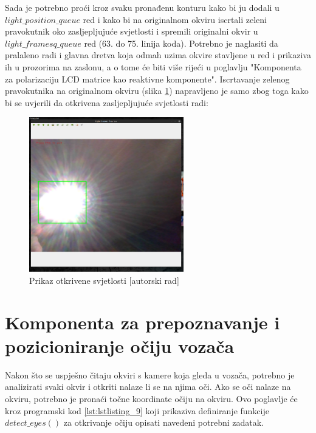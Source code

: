 \documentclass{foi}
\begin{document}
Sada je potrebno proći kroz svaku pronađenu konturu kako bi ju dodali u $light\_position\_queue$ red i kako bi na originalnom okviru iscrtali zeleni pravokutnik oko zasljepljujuće svjetlosti i spremili originalni okvir u $light\_framesq\_queue$ red (63. do 75. linija koda). Potrebno je naglasiti da pralaleno radi i glavna dretva koja odmah uzima okvire stavljene u red i prikaziva ih u prozorima na zaslonu, a o tome će biti više rijeći u poglavlju "Komponenta za polarizaciju LCD matrice kao reaktivne komponente". Iscrtavanje zelenog pravokutnika na originalnom okviru (slika \ref{fig:sustav2}) napravljeno je samo zbog toga kako bi se uvjerili da otkrivena zasljepljujuće svjetlosti radi:

\begin{figure}[h!]
    \centering
    \includegraphics[width=0.6\textwidth]{slike/sustav2}
    \caption{Prikaz otkrivene svjetlosti [autorski rad]}
    \label{fig:sustav2}
\end{figure}

\pagebreak
\section{Komponenta za prepoznavanje i pozicioniranje očiju vozača}

Nakon što se uspješno čitaju okviri s kamere koja gleda u vozača, potrebno je analizirati svaki okvir i otkriti nalaze li se na njima oči. Ako se oči nalaze na okviru, potrebno je pronaći točne koordinate očiju na okviru. Ovo poglavlje će kroz programski kod \ref{lst:lstlisting_9} koji prikaziva definiranje funkcije $detect\_eyes()$ za otkrivanje očiju opisati navedeni potrebni zadatak.
\end{document}
